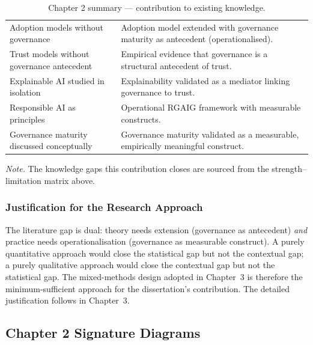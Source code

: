{\tablestripes\tablefontsize
{}
\begin{xltabular}{\textwidth}{@{} >{\raggedright\arraybackslash}p{5cm} L @{}}
\caption[Chapter 2 summary --- contribution to existing knowledge]{Chapter 2 summary --- contribution to existing knowledge.}\label{tab:ch2_knowledge_contribution} \\
\toprule
{} &  \\
\midrule
\endfirsthead
\endhead
\bottomrule
\endlastfoot
Adoption models without governance & Adoption model extended with governance maturity as antecedent (operationalised). \\
\addlinespace
Trust models without governance antecedent & Empirical evidence that governance is a structural antecedent of trust. \\
\addlinespace
Explainable AI studied in isolation & Explainability validated as a mediator linking governance to trust. \\
\addlinespace
Responsible AI as principles & Operational RGAIG framework with measurable constructs. \\
\addlinespace
Governance maturity discussed conceptually & Governance maturity validated as a measurable, empirically meaningful construct. \\
\end{xltabular}}

\vspace{0.3em}\noindent\textit{Note.} The knowledge gaps this contribution closes are sourced from the strength--limitation matrix above.


\subsubsection{Justification for the Research Approach}
\label{sec:ch2_approach_justification}

\noindent The literature gap is dual: theory needs extension (governance as antecedent) \emph{and} practice needs operationalisation (governance as measurable construct). A purely quantitative approach would close the statistical gap but not the contextual gap; a purely qualitative approach would close the contextual gap but not the statistical gap. The mixed-methods design adopted in Chapter~3 is therefore the minimum-sufficient approach for the dissertation's contribution. The detailed justification follows in Chapter~3.


\subsection{Chapter 2 Signature Diagrams}
\label{sec:ch2_signature_diagrams}

